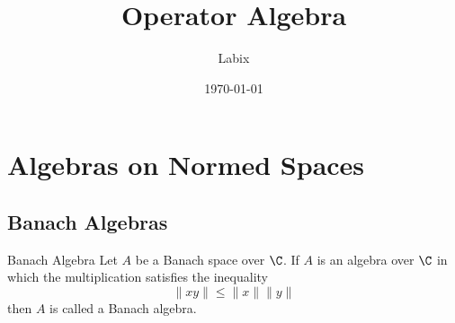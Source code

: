 \documentclass[a4paper]{article}
\title{Operator Algebra}
\author{Labix}
\date{\today}
\begin{document}
\maketitle
\begin{abstract}
\end{abstract}
\tableofcontents
\pagebreak

\section{Algebras on Normed Spaces}
\subsection{Banach Algebras}
\begin{defn}{Banach Algebra}{} Let $A$ be a Banach space over $\C$. If $A$ is an algebra over $\C$ in which the multiplication satisfies the inequality $$\|xy\|\leq\|x\|\|y\|$$ then $A$ is called a Banach algebra. 
\end{defn}
\end{document}
